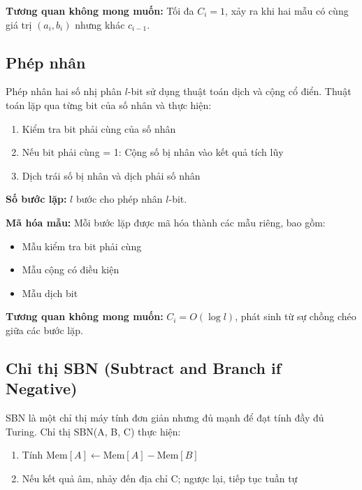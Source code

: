 \vspace{0.2cm}

\textbf{Tương quan không mong muốn:} Tối đa $C_i = 1$, xảy ra khi hai mẫu có cùng giá trị $(a_i, b_i)$ nhưng khác $c_{i-1}$.

\subsection{Phép nhân}

Phép nhân hai số nhị phân $l$-bit sử dụng thuật toán dịch và cộng cổ điển. Thuật toán lặp qua từng bit của số nhân và thực hiện:
\begin{enumerate}
    \item Kiểm tra bit phải cùng của số nhân
    \item Nếu bit phải cùng = 1: Cộng số bị nhân vào kết quả tích lũy
    \item Dịch trái số bị nhân và dịch phải số nhân
\end{enumerate}

\textbf{Số bước lặp:} $l$ bước cho phép nhân $l$-bit.

\vspace{0.3cm}

\textbf{Mã hóa mẫu:} Mỗi bước lặp được mã hóa thành các mẫu riêng, bao gồm:

\begin{itemize}
    \item Mẫu kiểm tra bit phải cùng
    \item Mẫu cộng có điều kiện
    \item Mẫu dịch bit
\end{itemize}

\vspace{-0.1cm}

\textbf{Tương quan không mong muốn:} $C_i = O(\log l)$, phát sinh từ sự chồng chéo giữa các bước lặp.

\subsection{Chỉ thị SBN (Subtract and Branch if Negative)}

SBN là một chỉ thị máy tính đơn giản nhưng đủ mạnh để đạt tính đầy đủ Turing. Chỉ thị SBN(A, B, C) thực hiện:
\begin{enumerate}
    \item Tính $\text{Mem}[A] \leftarrow \text{Mem}[A] - \text{Mem}[B]$
    \item Nếu kết quả âm, nhảy đến địa chỉ C; ngược lại, tiếp tục tuần tự
\end{enumerate}


